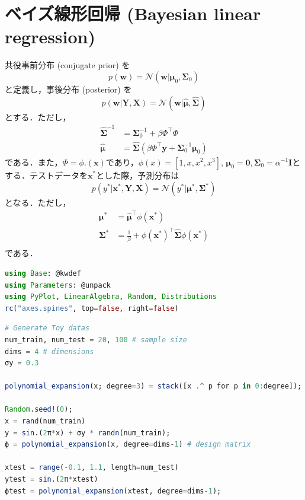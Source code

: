 \section{ベイズ線形回帰 (Bayesian linear regression)}
共役事前分布 (conjugate prior) を
\begin{equation}
p(\mathbf{w})=\mathcal{N}(\mathbf{w}|\boldsymbol{\mu}_0, \boldsymbol{\Sigma}_0)
\end{equation}
と定義し，事後分布 (posterior) を
\begin{equation}
p(\mathbf{w}|\mathbf{Y}, \mathbf{X})=\mathcal{N}(\mathbf{w}|\hat{\boldsymbol{\mu}}, \hat{\boldsymbol{\Sigma}})
\end{equation}
とする．ただし，
\begin{align}
\hat{\boldsymbol{\Sigma}}^{-1}&= \boldsymbol{\Sigma}_0^{-1}+ \beta \Phi^\top\Phi\\
\hat{\boldsymbol{\mu}}&=\hat{\boldsymbol{\Sigma}} (\beta \Phi^\top \mathbf{y}+\boldsymbol{\Sigma}_0^{-1}\boldsymbol{\mu}_0)
\end{align}
である．また，$\Phi=\phi.(\mathbf{x})$であり，$\phi(x)=[1, x, x^2, x^3]$, $\boldsymbol{\mu}_0=\mathbf{0}, \boldsymbol{\Sigma}_0= \alpha^{-1} \mathbf{I}$とする．テストデータを$\mathbf{x}^*$とした際，予測分布は
\begin{equation}
p(y^*|\mathbf{x}^*, \mathbf{Y}, \mathbf{X})=\mathcal{N}(y^*|\boldsymbol{\mu}^*, \boldsymbol{\Sigma}^*)
\end{equation}
となる．ただし，
\begin{align}
\boldsymbol{\mu}^*&=\hat{\boldsymbol{\mu}}^\top \phi(\mathbf{x}^*)\\
\boldsymbol{\Sigma}^* &= \frac{1}{\beta} +  \phi(\mathbf{x}^*)^\top\hat{\boldsymbol{\Sigma}}\phi(\mathbf{x}^*)\\
\end{align}
である．
\begin{lstlisting}[language=julia]
using Base: @kwdef
using Parameters: @unpack
using PyPlot, LinearAlgebra, Random, Distributions
rc("axes.spines", top=false, right=false)
\end{lstlisting}
\begin{lstlisting}[language=julia]
# Generate Toy datas
num_train, num_test = 20, 100 # sample size
dims = 4 # dimensions
σy = 0.3

polynomial_expansion(x; degree=3) = stack([x .^ p for p in 0:degree]);

Random.seed!(0);
x = rand(num_train)
y = sin.(2π*x) + σy * randn(num_train);
ϕ = polynomial_expansion(x, degree=dims-1) # design matrix

xtest = range(-0.1, 1.1, length=num_test)
ytest = sin.(2π*xtest)
ϕtest = polynomial_expansion(xtest, degree=dims-1);
\end{lstlisting}
